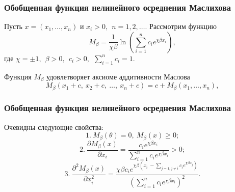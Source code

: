 \documentclass[10pt, pdf, hyperref={unicode}]{beamer}
\begin{document}
    \begin{frame}
        \frametitle{Обобщенная функция нелинейного осреднения Маслихова}
        \begin{center}
            \begin{minipage}[h]{0.97\linewidth}
                Пусть $x=(x_1,\ldots,x_n)$ и $x_i>0, \ \ n=1,2,\ldots$. Рассмотрим функцию
                \begin{equation}\label{f221}
                M_{\beta}=\frac1{\chi \beta} \ln \left( \sum\limits^n_{i=1} c_i e^{\chi\beta x_i} \right), %
                \end{equation}
                где $\chi=\pm1, \ \ \beta>0, \ \ c_i>0, \ \ \sum\limits^n_{i=1} c_i =1$.

                Функция $M_{\beta}$ удовлетворяет аксиоме аддитивности Маслова
                \begin{equation}\label{f222}
                M_\beta(x_1+c,\ x_2+c, \ \ldots , \ x_n+c)=c+M_\beta(x_1,\ldots, x_n),%
                \end{equation}
            \end{minipage}
        \end{center}
    \end{frame}

    \begin{frame}
        \frametitle{Обобщенная функция нелинейного осреднения Маслихова}
        \begin{center}
            \begin{minipage}[h]{0.97\linewidth}
                Очевидны следующие свойства:
                \begin{equation}\label{f223}
                1. \ M_\beta(\theta)=0, \ M_\beta(x)\geq 0; %
                \end{equation}
                \begin{equation}\label{f22}
                2. \ \frac{\partial M_\beta(x)}{\partial x_i}=\frac{c_i e^{\chi
                \beta x_i}}{\sum\limits_{i=1}^n c_i e^{\chi \beta x_i}} > 0;
                \end{equation}
                \begin{equation}\label{f225}
                3. \ \frac{\partial^2 M_\beta(x)}{\partial x_i^2}=\frac{\chi \beta
                c_i e^{\chi \beta ( x_i \ - \sum\limits_{j=1, j\neq i} c_i e^{\chi
                \beta x_j})}}{\left(\sum\limits_{i=1}^n c_i e^{\chi \beta
                x_i}\right)^2}.%
                \end{equation}
            \end{minipage}
        \end{center}
    \end{frame}
\end{document}
